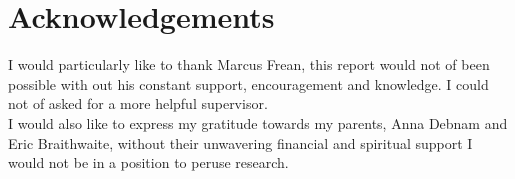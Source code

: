 \chapter*{Acknowledgements}
\thispagestyle{empty}
I would particularly like to thank Marcus Frean, this report would not of been possible with out his constant support, encouragement and knowledge. I could not of asked for a more helpful supervisor.\\

I would also like to express my gratitude towards my parents, Anna Debnam and Eric Braithwaite, without their unwavering financial and spiritual support I would not be in a position to peruse research.


